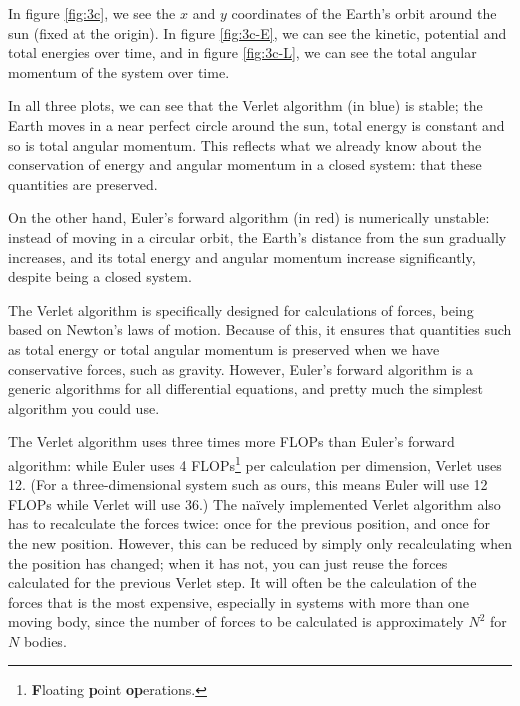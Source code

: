 \documentclass[11pt,a4paper]{article}
\begin{document}
In figure \ref{fig:3c}, we see the $x$ and $y$ coordinates of the Earth's orbit around the sun (fixed at the origin). In figure \ref{fig:3c-E}, we can see the kinetic, potential and total energies over time, and in figure \ref{fig:3c-L}, we can see the total angular momentum of the system over time.

In all three plots, we can see that the Verlet algorithm (in blue) is stable; the Earth moves in a near perfect circle around the sun, total energy is constant and so is total angular momentum. This reflects what we already know about the conservation of energy and angular momentum in a closed system: that these quantities are preserved.

On the other hand, Euler's forward algorithm (in red) is numerically unstable: instead of moving in a circular orbit, the Earth's distance from the sun gradually increases, and its total energy and angular momentum increase significantly, despite being a closed system.

The Verlet algorithm is specifically designed for calculations of forces, being based on Newton's laws of motion. Because of this, it ensures that quantities such as total energy or total angular momentum is preserved when we have conservative forces, such as gravity. However, Euler's forward algorithm is a generic algorithms for all differential equations, and pretty much the simplest algorithm you could use.

The Verlet algorithm uses three times more FLOPs than Euler's forward algorithm: while Euler uses 4 FLOPs\footnote{\textbf{F}loating \textbf{p}oint \textbf{op}erations.} per calculation per dimension, Verlet uses 12. (For a three-dimensional system such as ours, this means Euler will use 12 FLOPs while Verlet will use 36.) The naïvely implemented Verlet algorithm also has to recalculate the forces twice: once for the previous position, and once for the new position. However, this can be reduced by simply only recalculating when the position has changed; when it has not, you can just reuse the forces calculated for the previous Verlet step. It will often be the calculation of the forces that is the most expensive, especially in systems with more than one moving body, since the number of forces to be calculated is approximately $N^2$ for $N$ bodies.
\end{document}
